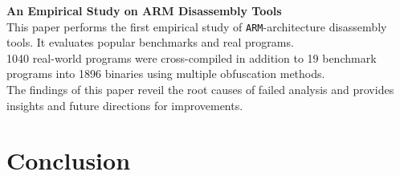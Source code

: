 \documentclass[seminar]{plai}
\begin{document}
\noindent\textbf{An Empirical Study on ARM Disassembly Tools}\\
This paper performs the first empirical study of \texttt{ARM}-architecture disassembly tools. It evaluates popular benchmarks and real programs.\\
1040 real-world programs were cross-compiled in addition to 19 benchmark programs into 1896 binaries using multiple obfuscation methods.\\
The findings of this paper reveil the root causes of failed analysis and provides insights and future directions for improvements.\cite{an-empirical-study-on-ARM-disassembly-disassembly-tools} 

\section{Conclusion}
\label{sec:conclusion}




\end{document}
